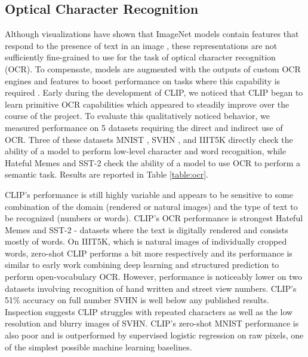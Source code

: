 \documentclass{article}
\begin{document}
\subsection{Optical Character Recognition}

Although visualizations have shown that ImageNet models contain features that respond to the presence of text in an image \citep{zeiler2014visualizing}, these representations are not sufficiently fine-grained to use for the task of optical character recognition (OCR). To compensate, models are augmented with the outputs of custom OCR engines and features to boost performance on tasks where this capability is required \citep{singh2019towards,yang2020tap}. Early during the development of CLIP, we noticed that CLIP began to learn primitive OCR capabilities which appeared to steadily improve over the course of the project. To evaluate this qualitatively noticed behavior, we measured performance on 5 datasets requiring the direct and indirect use of OCR. Three of these datasets MNIST \citep{lecun1998mnist}, SVHN \citep{netzer2011reading}, and IIIT5K \citep{mishra2012scene} directly check the ability of a model to perform low-level character and word recognition, while Hateful Memes \citep{kiela2020hateful} and SST-2 \citep{socher2013recursive} check the ability of a model to use OCR to perform a semantic task. Results are reported in Table \ref{table:ocr}. 

CLIP's performance is still highly variable and appears to be sensitive to some combination of the domain (rendered or natural images) and the type of text to be recognized (numbers or words). CLIP's OCR performance is strongest Hateful Memes and SST-2 - datasets where the text is digitally rendered and consists mostly of words. On IIIT5K, which is natural images of individually cropped words, zero-shot CLIP performs a bit more respectively and its performance is similar to \citet{jaderberg2014deep} early work combining deep learning and structured prediction to perform open-vocabulary OCR. However, performance is noticeably lower on two datasets involving recognition of hand written and street view numbers. CLIP's 51\% accuracy on full number SVHN is well below any published results. Inspection suggests CLIP struggles with repeated characters as well as the low resolution and blurry images of SVHN. CLIP's zero-shot MNIST performance is also poor and is outperformed by supervised logistic regression on raw pixels, one of the simplest possible machine learning baselines.
\end{document}

